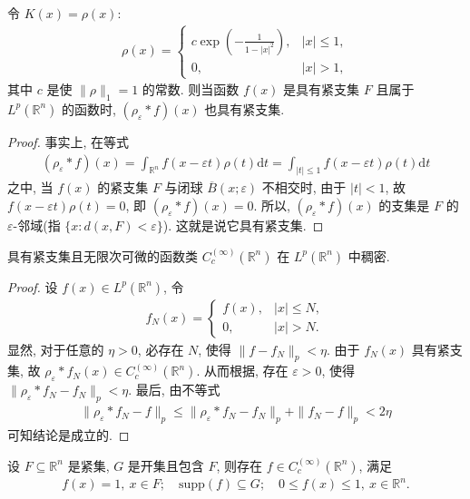 \documentclass[../../main.tex]{subfiles}%
\begin{document}
\begin{proposition}
令 $K(x)=\rho(x)$:
\begin{align*}
\rho(x) = 
\begin{cases}
c\exp\left( -\frac{1}{1-|x|^2} \right), & |x|\leqslant 1, \\
0, & |x|>1,
\end{cases}
\end{align*}
其中 $c$ 是使 $\|\rho\|_1=1$ 的常数. 则当函数 $f(x)$ 是具有紧支集 $F$ 且属于 $L^p(\mathbb{R}^n)$ 的函数时, $(\rho_\varepsilon * f)(x)$ 也具有紧支集.
\end{proposition}
\begin{proof}
事实上, 在等式
\begin{align*}
(\rho_\varepsilon * f)(x) = \int_{\mathbb{R}^n} f(x-\varepsilon t) \rho(t) \mathrm{d}t = \int_{|t|\leqslant 1} f(x-\varepsilon t) \rho(t) \mathrm{d}t
\end{align*}
之中, 当 $f(x)$ 的紧支集 $F$ 与闭球 $\overline{B}(x;\varepsilon)$ 不相交时, 由于 $|t|<1$, 故 $f(x-\varepsilon t)\rho(t)=0$, 即 $(\rho_\varepsilon * f)(x)=0$. 所以, $(\rho_\varepsilon * f)(x)$ 的支集是 $F$ 的 $\varepsilon$-邻域(指 $\{x: d(x,F)<\varepsilon\}$). 这就是说它具有紧支集.
\end{proof}

\begin{theorem}
具有紧支集且无限次可微的函数类 $C_c^{(\infty)}(\mathbb{R}^n)$ 在 $L^p(\mathbb{R}^n)$ 中稠密.
\end{theorem}
\begin{proof}
设 $f(x)\in L^p(\mathbb{R}^n)$, 令
\begin{align*}
f_N(x) = 
\begin{cases}
f(x), & |x|\leqslant N, \\
0, & |x|>N.
\end{cases}
\end{align*}
显然, 对于任意的 $\eta>0$, 必存在 $N$, 使得 $\|f-f_N\|_p<\eta$. 由于 $f_N(x)$ 具有紧支集, 故 $\rho_\varepsilon * f_N(x)\in C_c^{(\infty)}(\mathbb{R}^n)$. 从而根据, 存在 $\varepsilon>0$, 使得 $\|\rho_\varepsilon * f_N - f_N\|_p < \eta$. 最后, 由不等式
\begin{align*}
\|\rho_\varepsilon * f_N - f\|_p \leqslant \|\rho_\varepsilon * f_N - f_N\|_p + \|f_N - f\|_p < 2\eta
\end{align*}
可知结论是成立的.
\end{proof}

\begin{theorem}\label{theorem:实变函数--定理2882io}
设 $F\subseteq \mathbb{R}^n$ 是紧集, $G$ 是开集且包含 $F$, 则存在 $f\in C_c^{(\infty)}(\mathbb{R}^n)$, 满足
\begin{align*}
f(x)=1, \ x\in F; \quad \mathrm{supp}(f)\subseteq G; \quad 0\leqslant f(x)\leqslant 1, \ x\in \mathbb{R}^n.
\end{align*}
\end{theorem}
\end{document}
